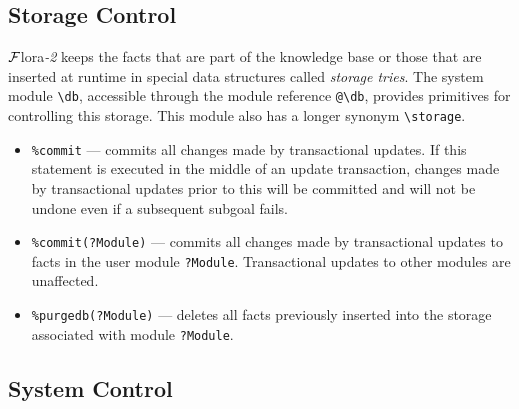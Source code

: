 \documentclass[11pt]{article}
\newcommand{\FLORA}{{\mbox{\sc ${\cal F}${lora}\rm\emph{-2}}}\xspace}
\newcommand{\FLSYSTEM}{\FLORA}
\newcommand{\bs}{\textbackslash}
\begin{document}
\subsection{Storage Control}\label{sec:storage-ctl}

\FLSYSTEM keeps the facts that are part of the knowledge base or those that are
inserted at runtime in special data structures called \emph{storage
  tries}.  The system module {\tt \bs{}db}, accessible through the module
reference {\tt @\bs{}db}, provides primitives for controlling this
storage. This module also has a longer synonym {\tt \bs{}storage}. 
\begin{itemize}
  \item  {\tt \verb|%|commit} --- commits all changes made by transactional updates.
    If this statement is executed in the middle of an update transaction,
    changes made by transactional updates prior to this will be committed
    and will not be undone even if a subsequent subgoal fails.
  \item {\tt \verb|%|commit(?Module)} --- commits all changes made by transactional
    updates to facts in the user module {\tt ?Module}. Transactional updates
    to other modules are unaffected.
  \item {\tt \verb|%|purgedb(?Module)} --- deletes all facts previously inserted
    into the storage associated with module {\tt ?Module}.
\end{itemize}

\subsection{System Control}\label{sec-flora-syscontrol}
\end{document}
